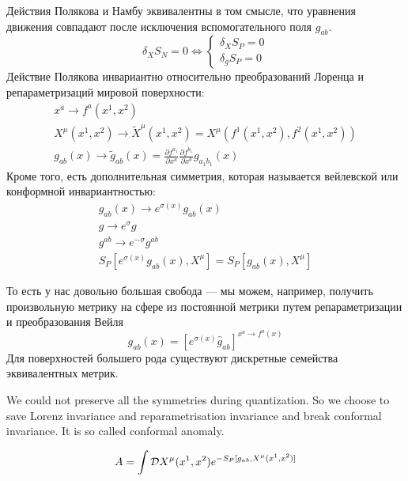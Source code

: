 \documentclass[a4paper,12pt]{article}
\theoremstyle{definition} \newtheorem{Def}{Definition}
\begin{document}
Действия Полякова и Намбу эквивалентны в том смысле, что уравнения движения совпадают после исключения вспомогательного поля $g_{ab}$.
\begin{equation}
  \label{eq:6}
  \delta_{X}S_N=0 \Longleftrightarrow \left\{
      \begin{aligned}
        \delta_X S_P=0\\
        \delta_g S_P=0
      \end{aligned}
      \right.
\end{equation}
Действие Полякова инвариантно относительно преобразований Лоренца и репараметризаций мировой поверхности:
\begin{equation}
  \label{eq:7}
  \begin{split}
    x^a \to f^a (x^1,x^2)\\
    X^{\mu}(x^1,x^2)\to \tilde{X}^{\mu}(x^1,x^2)=X^{\mu}(f^1(x^1,x^2),f^2(x^1,x^2))\\
    g_{ab}(x)\to \tilde{g}_{ab}(x)=\frac{\partial f^{a_1}}{\partial x^{a}}\frac{\partial f^{b_1}}{\partial x^b} g_{a_1 b_1}(x)
  \end{split}  
\end{equation}
Кроме того, есть дополнительная симметрия, которая называется вейлевской или конформной инвариантностью:
\begin{equation}
  \label{eq:8}
  \begin{split}
    g_{ab}(x)\to e^{\sigma(x)}g_{ab}(x)\\
    g\to e^{\sigma} g\\
    g^{ab}\to e^{-\sigma} g^{ab}\\
    S_P[e^{\sigma(x)} g_{ab}(x),X^{\mu}] = S_P[g_{ab}(x),X^{\mu}] 
  \end{split}
\end{equation}

То есть у нас довольно большая свобода --- мы можем, например, получить произвольную метрику на сфере из постоянной метрики путем репараметризации и преобразования Вейля
\begin{equation}
  \label{eq:9}
  g_{ab}(x)=[e^{\sigma(x)}\hat{g}_{ab}]^{x^a\to f^a (x)}
\end{equation}
Для поверхностей большего рода существуют дискретные семейства эквивалентных метрик.

We could not preserve all the symmetries during quantization. So we choose to save Lorenz invariance and reparametrisation invariance and break conformal invariance. It is so called conformal anomaly.

\begin{equation}
  \label{eq:10}
  A=\int {\cal D}X^{\mu}(x^1,x^2)e^{-S_P[g_{ab},X^{\mu}(x^1,x^2)]}
\end{equation}
\end{document}
